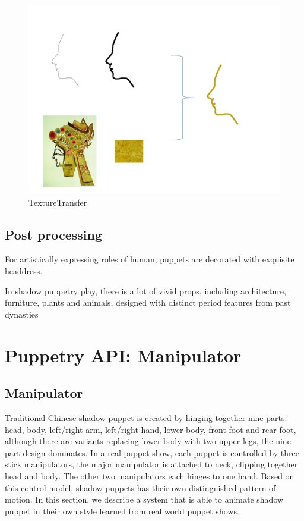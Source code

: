 \documentclass[letter]{sig-alternate}
\begin{document}
\begin{figure}[t]
\begin{center}
\includegraphics[scale=0.3]{figure/TextureTransfer.pdf}
\caption{\small{TextureTransfer}}
\label{fig:firstfig}
\end{center}
\end{figure}
    

\subsection{Post processing}
For artistically expressing roles of human, puppets are decorated with exquisite headdress. 

In shadow puppetry play, there is a lot of vivid props, including architecture, furniture, plants and animals, designed with distinct period features from past dynasties

\section{Puppetry API:  Manipulator}

\subsection{Manipulator}

Traditional Chinese shadow puppet is created by hinging together nine parts: head, body, left/right arm, left/right hand, lower body, front foot and rear foot, although there are variants replacing lower body with two upper legs, the nine-part design dominates. In a real puppet show, each puppet is controlled by three stick manipulators, the major manipulator is attached to neck, clipping together head and body. The other two manipulators each hinges to one hand. Based on this control model, shadow puppets has their own distinguished pattern of motion. In this section, we describe a system that is able to animate shadow puppet in their own style learned from real world puppet shows.
\end{document}
